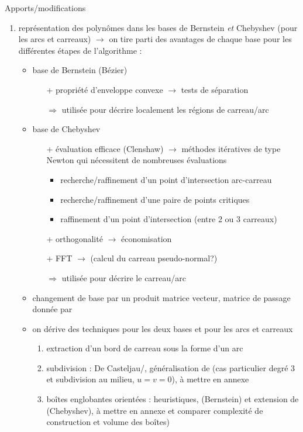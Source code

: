 Apports/modifications
\begin{enumerate}
	\item représentation des polynômes dans les bases de Bernstein \textit{et} Chebyshev (pour les arcs et carreaux) $\to$ on tire parti des avantages de chaque base pour les différentes étapes de l'algorithme :
	\begin{itemize}
		\item base de Bernstein (Bézier) 
		\begin{itemize}
			\item[+] propriété d'enveloppe convexe $\to$ tests de séparation
			\item[$\Rightarrow$] utilisée pour décrire localement les régions de carreau/arc
		\end{itemize}
		\item base de Chebyshev
		\begin{itemize}
			\item[+] évaluation efficace (Clenshaw) $\to$ méthodes itératives de type Newton qui nécessitent de nombreuses évaluations
			\begin{itemize}
				\item recherche/raffinement d'un point d'intersection arc-carreau
				\item recherche/raffinement d'une paire de points critiques
				\item raffinement d'un point d'intersection (entre 2 ou 3 carreaux)
			\end{itemize}
			\item[+] orthogonalité $\to$ économisation
			\item[+] FFT $\to$ (calcul du carreau pseudo-normal?)
			\item[$\Rightarrow$] utilisée pour décrire le carreau/arc 
		\end{itemize}
		\item changement de base par un produit matrice vecteur, matrice de passage donnée par \cite{rababah2003}
		\item on dérive des techniques pour les deux bases et pour les arcs et carreaux
		\begin{enumerate}
			\item extraction d'un bord de carreau sous la forme d'un arc
			\item subdivision : De Casteljau/, généralisation de \cite{fournier1994} (cas particulier degré 3 et subdivision au milieu, \ie $u = v = 0$), à mettre en annexe
			\item boîtes englobantes orientées : heuristiques, \cite{munkberg2010} (Bernstein) et extension de \cite{campagna1997} (Chebyshev), à mettre en annexe et comparer complexité de construction et volume des boîtes)
		\end{enumerate}
	\end{itemize}
\end{enumerate}




